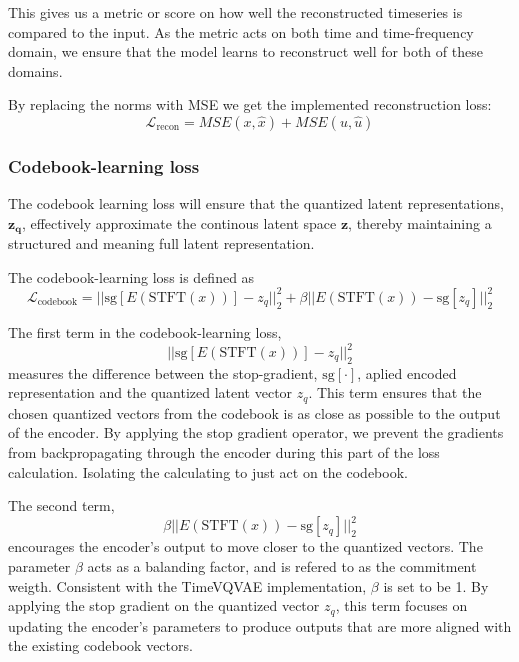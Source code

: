 This gives us a metric or score on how well the reconstructed timeseries is compared to the input. As the metric acts on both time and time-frequency domain, we ensure that the 
model learns to reconstruct well for both of these domains.

By replacing the norms with MSE we get the implemented reconstruction loss:
\begin{equation}
    \mathcal{L}_{\text{recon}} = MSE(x,\hat{x}) + MSE(u, \hat{u})
    \label{eq:recon}
\end{equation}

\subsubsection{Codebook-learning loss}
The codebook learning loss will ensure that the quantized latent representations, $\mathbf{z_q}$, effectively approximate the continous latent space $\mathbf{z}$, thereby maintaining a structured and meaning full latent representation. 

The codebook-learning loss is defined as
\begin{equation}
    \mathcal{L}_\text{codebook} = ||\text{sg}\left[ E(\text{STFT}(x))\right] - z_q||_2^2 + \beta|| E(\text{STFT}(x)) - \text{sg}\left[ z_q \right]||_2^2
    \label{eq:codebook}
\end{equation}

The first term in the codebook-learning loss,
\begin{equation}
    ||\text{sg}\left[ E(\text{STFT}(x))\right] - z_q||_2^2
    \label{eq:codebook_update}
\end{equation}
measures the difference between the stop-gradient, $\text{sg}\left[\cdot\right]$, aplied encoded representation and the quantized latent vector $z_q$. This term ensures that the chosen quantized vectors from the codebook is as close as possible to the output of the encoder. By applying the stop gradient operator, we prevent the gradients from backpropagating through the encoder during this part of the loss calculation.
Isolating the calculating to just act on the codebook.

The second term,
\begin{equation}
    \beta|| E(\text{STFT}(x)) - \text{sg}\left[ z_q \right]||_2^2
\end{equation}
encourages the encoder's output to move closer to the quantized vectors. The parameter $\beta$ acts as a balanding factor, and is refered to as the commitment weigth. Consistent with the TimeVQVAE implementation, $\beta$ is set to be 1.
By applying the stop gradient on the quantized vector $z_q$, this term focuses on updating the encoder's parameters to produce outputs that are more aligned with the existing
codebook vectors.

